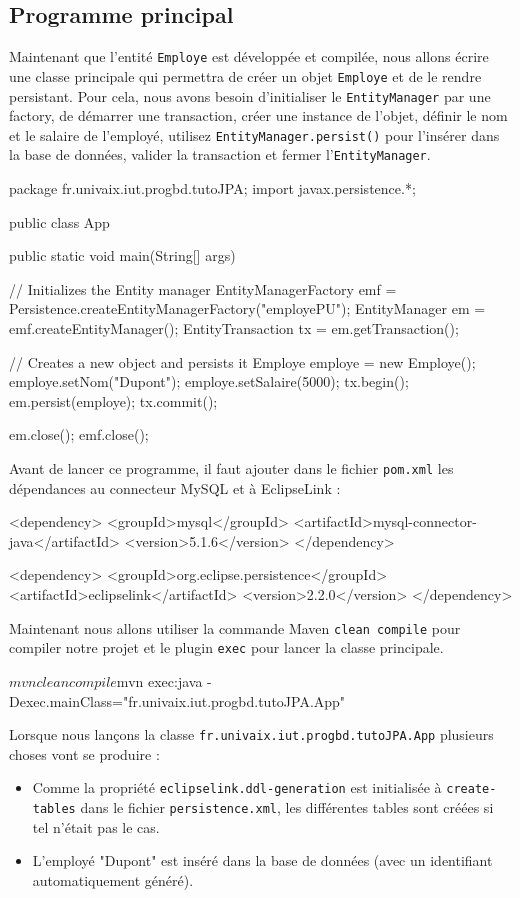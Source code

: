 \documentclass[a4paper,11pt]{article}
\begin{document}
\subsection{Programme principal}
Maintenant que l'entité \texttt{Employe} est développée et compilée, nous allons écrire une classe principale qui 
permettra de créer un objet \texttt{Employe} et de le rendre persistant. Pour cela, nous avons besoin d'initialiser le 
\texttt{EntityManager} par une factory, de démarrer une transaction, créer une instance de l'objet, 
définir le nom et le salaire de l'employé, utilisez \texttt{EntityManager.persist()} pour l'insérer dans la base de données, 
valider la transaction et fermer l'\texttt{EntityManager}.
\begin{code_java}
package fr.univaix.iut.progbd.tutoJPA;
import javax.persistence.*;

public class App 
{
    public static void main(String[] args) {
        // Initializes the Entity manager
        EntityManagerFactory emf = Persistence.createEntityManagerFactory("employePU");
        EntityManager em = emf.createEntityManager();
        EntityTransaction tx = em.getTransaction();

        // Creates a new object and persists it
        Employe employe = new Employe();
        employe.setNom("Dupont");
        employe.setSalaire(5000);
        tx.begin();
        em.persist(employe);
        tx.commit();

        em.close();
        emf.close();
    }
}
\end{code_java}
Avant de lancer ce programme, il faut ajouter dans le fichier \texttt{pom.xml} les dépendances au connecteur MySQL et à EclipseLink :
\begin{code_xml}
<dependency>
	<groupId>mysql</groupId>
	<artifactId>mysql-connector-java</artifactId>
	<version>5.1.6</version>
</dependency>

<dependency>
	<groupId>org.eclipse.persistence</groupId>
	<artifactId>eclipselink</artifactId>
	<version>2.2.0</version>
</dependency>
\end{code_xml}
Maintenant nous allons utiliser la commande Maven \texttt{clean compile} pour compiler notre projet et le plugin \texttt{exec} pour lancer 
la classe principale.
\begin{code_shell}
$mvn clean compile
$mvn exec:java -Dexec.mainClass="fr.univaix.iut.progbd.tutoJPA.App"
\end{code_shell}
Lorsque nous lançons la classe \texttt{fr.univaix.iut.progbd.tutoJPA.App} plusieurs choses vont se produire :
\begin{itemize}
  \item Comme la propriété \texttt{eclipselink.ddl-generation} est initialisée à \texttt{create-tables} dans le fichier 
  \texttt{persistence.xml}, les différentes tables sont créées si tel n'était pas le cas.
  \item L'employé "Dupont" est inséré dans la base de données (avec un identifiant automatiquement généré).
\end{itemize}
\end{document}
